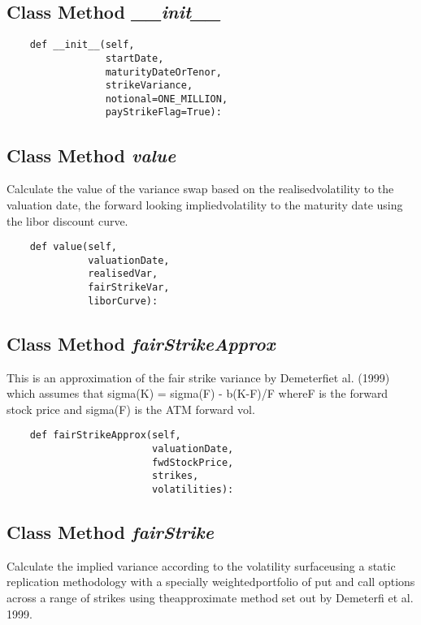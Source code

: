 \documentclass[twoside,11pt]{book}
\begin{document}
\subsection{Class Method {\it \_\_init\_\_}}


\begin{lstlisting}
    def __init__(self,
                 startDate,
                 maturityDateOrTenor,
                 strikeVariance,
                 notional=ONE_MILLION,
                 payStrikeFlag=True):
\end{lstlisting}

\subsection{Class Method {\it value}}
Calculate the value of the variance swap based on the realisedvolatility to the valuation date, the forward looking impliedvolatility to the maturity date using the libor discount curve. 

\begin{lstlisting}
    def value(self, 
              valuationDate, 
              realisedVar, 
              fairStrikeVar, 
              liborCurve):
\end{lstlisting}

\subsection{Class Method {\it fairStrikeApprox}}
This is an approximation of the fair strike variance by Demeterfiet al. (1999) which assumes that sigma(K) = sigma(F) - b(K-F)/F whereF is the forward stock price and sigma(F) is the ATM forward vol. 

\begin{lstlisting}
    def fairStrikeApprox(self,
                         valuationDate,
                         fwdStockPrice,
                         strikes,
                         volatilities):
\end{lstlisting}

\subsection{Class Method {\it fairStrike}}
Calculate the implied variance according to the volatility surfaceusing a static replication methodology with a specially weightedportfolio of put and call options across a range of strikes using theapproximate method set out by Demeterfi et al. 1999. 
\end{document}
